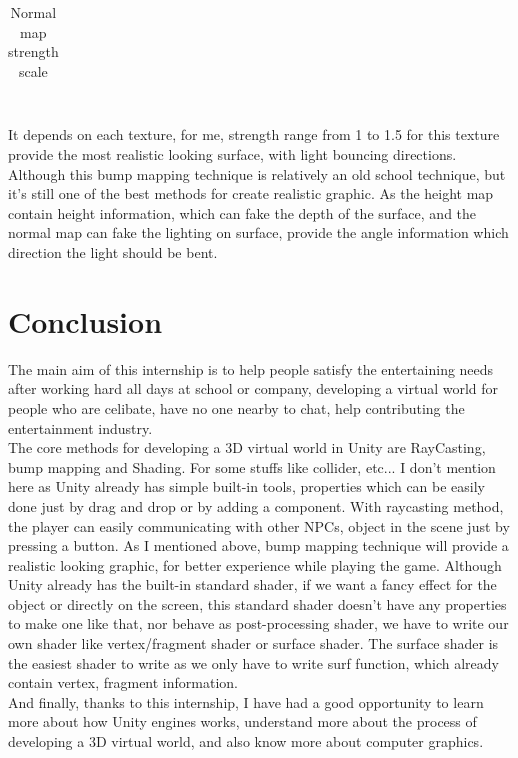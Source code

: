 \documentclass[a4paper, 13pt]{extarticle}
\begin{document}
{\begin{table}[h]
\begin{tabular}{|M{2.5cm}|M{4cm}|M{4cm}|}
 		\end{tabular}
 		\newline\newline
 		\caption{Normal map strength scale}\label{tab1}
 	\end{table} \\
 	It depends on each texture, for me, strength range from 1 to 1.5 for this texture provide the most realistic looking surface, with light bouncing directions. Although this bump mapping technique is relatively an old school technique, but it's still one of the best methods for create realistic graphic. As the height map contain height information, which can fake the depth of the surface, and the normal map can fake the lighting on surface, provide the angle information which direction the light should be bent. 
 		 
 	\section{Conclusion}  
 	The main aim of this internship is to help people satisfy the entertaining needs after working hard all days at school or company, developing a virtual world for people who are celibate, have no one nearby to chat, help contributing the entertainment industry. \\ The core methods for developing a 3D virtual world in Unity are RayCasting, bump mapping and Shading. For some stuffs like collider, etc... I don't mention here as Unity already has simple built-in tools, properties which can be easily done just by drag and drop or by adding a component. With raycasting method, the player can easily communicating with other NPCs, object in the scene just by pressing a button. As I mentioned above, bump mapping technique will provide a realistic looking graphic, for better experience while playing the game. Although Unity already has the built-in standard shader, if we want a fancy effect for the object or directly on the screen, this standard shader doesn't have any properties to make one like that, nor behave as post-processing shader, we have to write our own shader like vertex/fragment shader or surface shader. The surface shader is the easiest shader to write as we only have to write surf function, which already contain vertex, fragment information. \\ And finally, thanks to this internship, I have had a good opportunity to learn more about how Unity engines works, understand more about the process of developing a 3D virtual world, and also know more about computer graphics.   
}
\end{document}
